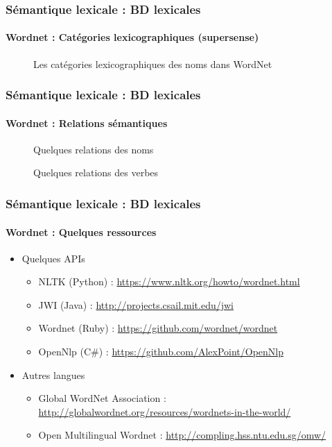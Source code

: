 \documentclass[xcolor=table]{beamer}
\begin{document}
\begin{frame}
\frametitle{Sémantique lexicale : BD lexicales}
\framesubtitle{Wordnet : Catégories lexicographiques (supersense)}
	
\begin{figure}
	\caption{Les catégories lexicographiques des noms dans WordNet \cite{2019-jurafsky-martin}}
\end{figure}
	
\end{frame}

\begin{frame}
\frametitle{Sémantique lexicale : BD lexicales}
\framesubtitle{Wordnet : Relations sémantiques}

\vspace{-3pt}
\begin{figure}
	\vspace{-9pt}
	\caption{Quelques relations des noms \cite{2019-jurafsky-martin}}
\end{figure}\vspace{-6pt}

\begin{figure}
	\vspace{-9pt}
	\caption{Quelques relations des verbes \cite{2019-jurafsky-martin}}
\end{figure}
	
\end{frame}

\begin{frame}
\frametitle{Sémantique lexicale : BD lexicales}
\framesubtitle{Wordnet : Quelques ressources}
	
\begin{itemize}
	\item Quelques APIs
	\begin{itemize}
		\item NLTK (Python) : \url{https://www.nltk.org/howto/wordnet.html}
		\item JWI (Java) : \url{http://projects.csail.mit.edu/jwi}
		\item Wordnet (Ruby) : \url{https://github.com/wordnet/wordnet}
		\item OpenNlp (C\#) : \url{https://github.com/AlexPoint/OpenNlp}
	\end{itemize}
	\item Autres langues
	\begin{itemize}
		\item Global WordNet Association : \url{http://globalwordnet.org/resources/wordnets-in-the-world/}
		\item Open Multilingual Wordnet : \url{http://compling.hss.ntu.edu.sg/omw/}
	\end{itemize}
\end{itemize}
	
\end{frame}
\end{document}
